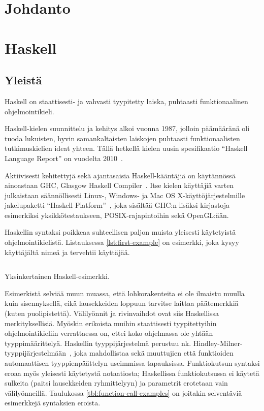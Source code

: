 \section{Johdanto}
\section{Haskell}
\subsection{Yleistä}
Haskell on staattisesti- ja vahvasti tyypitetty laiska, puhtaasti funktionaalinen ohjelmointikieli.

Haskell-kielen suunnittelu ja kehitys alkoi vuonna 1987,
jolloin päämääränä oli tuoda lukuisten, hyvin samankaltaisten laiskojen puhtaasti funktionaalisten tutkimuskielien ideat yhteen.
Tällä hetkellä kielen uusin spesifikaatio ``Haskell Language Report'' on vuodelta 2010~\cite{HaskellReport2010}.

Aktiivisesti kehitettyjä sekä ajantasaisia Haskell-kääntäjiä on käytännössä ainoastaan
GHC, Glasgow Haskell Compiler~\cite{GHC}.
Itse kielen käyttäjiä varten julkaistaan säännöllisesti Linux-, Windows- ja
Mac OS X-käyt\-tö\-jär\-jes\-tel\-mille  jakelupaketti ``Haskell Platform''~\cite{HaskellPlatform},
joka sisältää GHC:n lisäksi kirjastoja esimerkiksi yksikkötestaukseen, POSIX-rajapintoihin
sekä OpenGL:ään.

Haskellin syntaksi poikkeaa suhteellisen paljon muista yleisesti käytetyistä ohjelmointikielistä.
Listauksessa \ref{lst:first-example} on esimerkki,
joka kysyy käyttäjältä nimeä ja tervehtii käyttäjää.

\begin{listing}[H]
    \inputminted{haskell}{codes/FirstExample.hs}
    \label{lst:first-example}
    \caption{Yksinkertainen Haskell-esimerkki.}
\end{listing}

Esimerkistä selviää muun muassa, että lohkorakenteita ei ole ilmaistu muulla kuin sisennyksellä,
eikä lausekkeiden loppuun tarvitse laittaa päätemerkkiä (kuten puolipistettä).
Välilyönnit ja rivinvaihdot ovat siis Haskellissa merkityksellisiä.
Myöskin erikoista muihin staattisesti tyypitettyihin ohjelmointikieliin verrattaessa on,
ettei koko ohjelmassa ole yhtään tyyppimäärittelyä.
Haskellin tyyppijärjestelmä perustuu nk. Hindley-Milner-tyyppijärjestelmään~\cite{Hindley,Milner},
joka mahdollistaa sekä muuttujien että funktioiden automaattisen tyyppienpäättelyn useimmissa tapauksissa.
Funktiokutsun syntaksi eroaa myös yleisesti käytetystä notaatiosta;
Haskellissa funktiokutsussa ei käytetä sulkeita (paitsi lausekkeiden ryhmittelyyn) ja parametrit erotetaan vain välilyönneillä.
Taulukossa \ref{tbl:function-call-examples} on joitakin selventäviä esimerkkejä syntaksien eroista.

